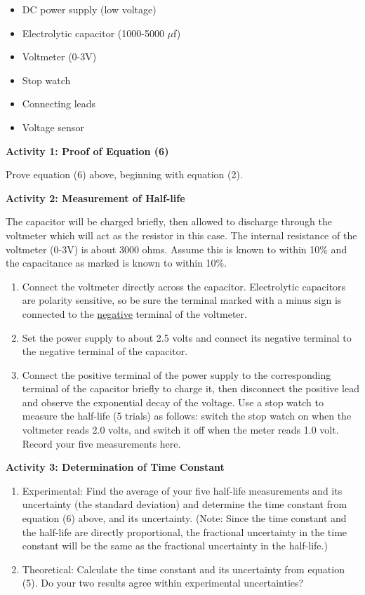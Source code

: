 \begin{itemize}
\item DC power supply (low voltage)
\item Electrolytic capacitor (1000-5000 $\mu$f)
\item Voltmeter (0-3V)
\item Stop watch
\item Connecting leads
\item Voltage sensor
\end{itemize}
\textbf{Activity 1: Proof of Equation (6)}

Prove equation (6) above, beginning with equation (2).
\vspace{3in}

\textbf{Activity 2: Measurement of Half-life}

The capacitor will be charged briefly, then allowed to discharge through the
voltmeter which will act as the resistor in this case. The internal resistance
of the voltmeter (0-3V) is about 3000 ohms.  Assume this is known to within
10\% and the capacitance as marked is known to within 10\%.

\begin{enumerate}
\item Connect the voltmeter directly across the capacitor.  Electrolytic
capacitors are polarity sensitive, so be sure the terminal marked with a minus
sign is connected to the \underline{negative} terminal of the voltmeter.

\item Set the power supply to about 2.5 volts and connect its negative terminal
to the negative terminal of the capacitor.

\item Connect the positive terminal of the power supply to the corresponding
terminal of the capacitor briefly to charge it, then disconnect the positive 
lead and observe the exponential decay of the voltage.  Use a stop watch to 
measure the half-life (5 trials) as follows: switch the stop watch on when the 
voltmeter reads 2.0 volts, and switch it off when the meter reads 1.0 volt. 
Record your five measurements here.\vspace{30mm}

\end{enumerate}

\textbf{Activity 3: Determination of Time Constant}

\begin{enumerate}
\item Experimental:  Find the average of your five half-life measurements and 
its uncertainty (the standard deviation) and determine the time constant from 
equation (6) above, and its uncertainty. (Note: Since the time constant and the 
half-life are directly proportional, the fractional uncertainty in the time 
constant will be the same as the fractional uncertainty in the half-life.)
\vspace{40mm}
\item Theoretical:  Calculate the time constant and its uncertainty from 
equation (5). Do your two results agree within experimental uncertainties?
\end{enumerate}

